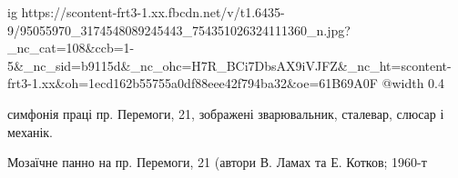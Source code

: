  
 
 
 
 

\ifcmt
  ig https://scontent-frt3-1.xx.fbcdn.net/v/t1.6435-9/95055970_3174548089245443_754351026324111360_n.jpg?_nc_cat=108&ccb=1-5&_nc_sid=b9115d&_nc_ohc=H7R_BCi7DbsAX9iVJFZ&_nc_ht=scontent-frt3-1.xx&oh=1ecd162b55755a0df88eee42f794ba32&oe=61B69A0F
  @width 0.4
\fi

симфонія праці пр. Перемоги, 21, зображені зварювальник, сталевар, слюсар і механік.

Мозаїчне панно на пр. Перемоги, 21 (автори В. Ламах та Е. Котков; 1960-т
